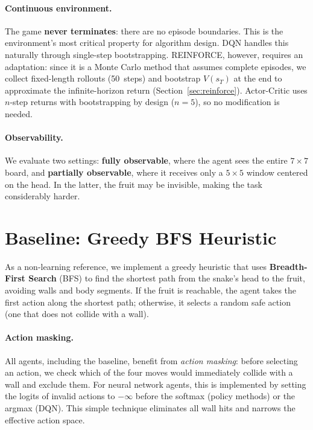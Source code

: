 \documentclass[11pt, a4paper]{article}
\begin{document}
\paragraph{Continuous environment.}
The game \textbf{never terminates}: there are no episode boundaries. This is the environment's
most critical property for algorithm design. DQN handles this naturally through single-step
bootstrapping. REINFORCE, however, requires an adaptation: since it is a Monte Carlo method
that assumes complete episodes, we collect fixed-length rollouts (50~steps) and bootstrap
$V(s_T)$ at the end to approximate the infinite-horizon return (Section~\ref{sec:reinforce}).
Actor-Critic uses $n$-step returns with bootstrapping by design ($n{=}5$), so no modification
is needed.

\paragraph{Observability.}
We evaluate two settings: \textbf{fully observable}, where the agent sees the entire
$7 \times 7$ board, and \textbf{partially observable}, where it receives only a $5 \times 5$
window centered on the head. In the latter, the fruit may be invisible, making the task
considerably harder.


\section{Baseline: Greedy BFS Heuristic}

As a non-learning reference, we implement a greedy heuristic that uses \textbf{Breadth-First
Search} (BFS) to find the shortest path from the snake's head to the fruit, avoiding walls and
body segments. If the fruit is reachable, the agent takes the first action along the shortest
path; otherwise, it selects a random safe action (one that does not collide with a wall).

\paragraph{Action masking.}
All agents, including the baseline, benefit from \emph{action masking}: before selecting an
action, we check which of the four moves would immediately collide with a wall and exclude
them. For neural network agents, this is implemented by setting the logits of invalid actions to
$-\infty$ before the softmax (policy methods) or the argmax (DQN). This simple technique
eliminates all wall hits and narrows the effective action space.
\end{document}
